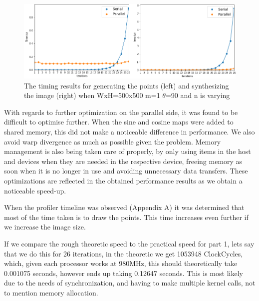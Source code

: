 \begin{figure}
	\includegraphics[width=.95\linewidth]{Images/timing.png}
	\centering
	\caption{The timing results for generating the points (left) and synthesizing the image (right) when WxH=500x500 m=1 $\theta$=90 and n is varying}
	\label{fig:timing}
\end{figure}

With regards to further optimization on the parallel side, it was found to be difficult to optimise further. When the sine and cosine maps were added to shared memory, this did not make a noticeable difference in performance. We also avoid warp divergence as much as possible given the problem. Memory management is also being taken care of properly, by only using items in the host and devices when they are needed in the respective device, freeing memory as soon when it is no longer in use and avoiding unnecessary data transfers. These optimizations are reflected in the obtained performance results as we obtain a noticeable speed-up.

When the profiler timeline was observed (Appendix A) it was determined that most of the time taken is to draw the points. This time increases even further if we increase the image size.

If we compare the rough theoretic speed to the practical speed for part 1, lets say that we do this for 26 iterations, in the theoretic we get 1053948 ClockCycles, which, given each processor works at 980MHz, this should theoretically take 0.001075 seconds, however ends up taking 0.12647 seconds. This is most likely due to the needs of synchronization, and having to make multiple kernel calls, not to mention memory allocation.